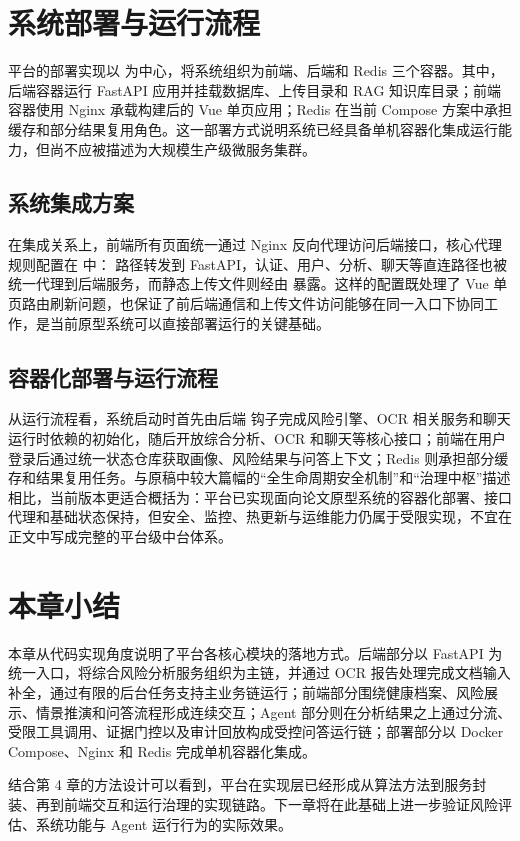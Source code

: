 \section{系统部署与运行流程}
\label{sec:deploy_security_impl}

平台的部署实现以  为中心，将系统组织为前端、后端和 Redis 三个容器。其中，后端容器运行 FastAPI 应用并挂载数据库、上传目录和 RAG 知识库目录；前端容器使用 Nginx 承载构建后的 Vue 单页应用；Redis 在当前 Compose 方案中承担缓存和部分结果复用角色。这一部署方式说明系统已经具备单机容器化集成运行能力，但尚不应被描述为大规模生产级微服务集群。

\subsection{系统集成方案}

在集成关系上，前端所有页面统一通过 Nginx 反向代理访问后端接口，核心代理规则配置在  中： 路径转发到 FastAPI，认证、用户、分析、聊天等直连路径也被统一代理到后端服务，而静态上传文件则经由  暴露。这样的配置既处理了 Vue 单页路由刷新问题，也保证了前后端通信和上传文件访问能够在同一入口下协同工作，是当前原型系统可以直接部署运行的关键基础。

\subsection{容器化部署与运行流程}

从运行流程看，系统启动时首先由后端  钩子完成风险引擎、OCR 相关服务和聊天运行时依赖的初始化，随后开放综合分析、OCR 和聊天等核心接口；前端在用户登录后通过统一状态仓库获取画像、风险结果与问答上下文；Redis 则承担部分缓存和结果复用任务。与原稿中较大篇幅的“全生命周期安全机制”和“治理中枢”描述相比，当前版本更适合概括为：平台已实现面向论文原型系统的容器化部署、接口代理和基础状态保持，但安全、监控、热更新与运维能力仍属于受限实现，不宜在正文中写成完整的平台级中台体系。

\section{本章小结}

本章从代码实现角度说明了平台各核心模块的落地方式。后端部分以 FastAPI 为统一入口，将综合风险分析服务组织为主链，并通过 OCR 报告处理完成文档输入补全，通过有限的后台任务支持主业务链运行；前端部分围绕健康档案、风险展示、情景推演和问答流程形成连续交互；Agent 部分则在分析结果之上通过分流、受限工具调用、证据门控以及审计回放构成受控问答运行链；部署部分以 Docker Compose、Nginx 和 Redis 完成单机容器化集成。

结合第 4 章的方法设计可以看到，平台在实现层已经形成从算法方法到服务封装、再到前端交互和运行治理的实现链路。下一章将在此基础上进一步验证风险评估、系统功能与 Agent 运行行为的实际效果。
